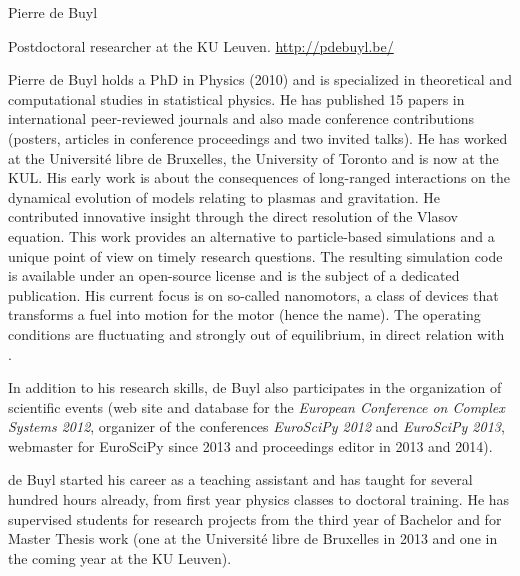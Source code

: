 \begin{participant}[type=R,gender=male]{Pierre de Buyl}

Postdoctoral researcher at the KU Leuven. \url{http://pdebuyl.be/}

Pierre de Buyl holds a PhD in Physics (2010) and is specialized in theoretical and
computational studies in statistical physics. He has published 15 papers in international
peer-reviewed journals and also made conference contributions (posters, articles in
conference proceedings and two invited talks). He has worked at the Université libre de
Bruxelles, the University of Toronto and is now at the KUL.
%
His early work is about the consequences of long-ranged interactions on the dynamical
evolution of models relating to plasmas and gravitation.
%
He contributed innovative insight through the direct resolution of the Vlasov equation.
This work provides an alternative to particle-based simulations and a unique point of view
on timely research questions. The resulting simulation code is available under an
open-source license and is the subject of a dedicated publication.
%
His current focus is on so-called nanomotors, a class of devices that transforms a fuel into
motion for the motor (hence the name). The operating conditions are fluctuating and strongly
out of equilibrium, in direct relation with \TheProject.

In addition to his research skills, de Buyl also participates in the organization of
scientific events (web site and database for the {\em European Conference on Complex Systems
  2012}, organizer of the conferences {\em EuroSciPy 2012} and {\em EuroSciPy 2013},
webmaster for EuroSciPy since 2013 and proceedings editor in 2013 and 2014).

de Buyl started his career as a teaching assistant and has taught for several hundred hours
already, from first year physics classes to doctoral training. He has supervised students
for research projects from the third year of Bachelor and for Master Thesis work (one at the
Université libre de Bruxelles in 2013 and one in the coming year at the KU Leuven).

\end{participant}
